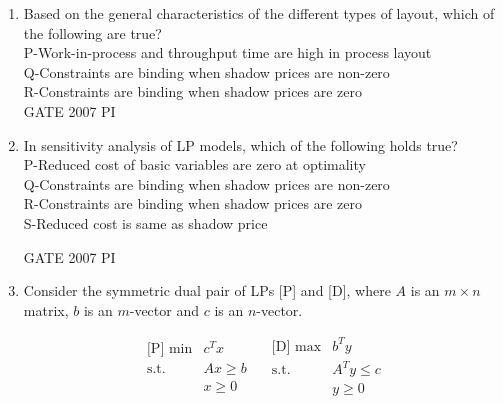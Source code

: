 \documentclass[journal,12pt,onecolumn]{IEEEtran}
\theoremstyle{remark}
\begin{document}
\begin{enumerate}
\item
Based on the general characteristics of the different types of layout, which of the following are true?\\
P-Work-in-process and throughput time are high in process layout\\

Q-Constraints are binding when shadow prices are non-zero \\

R-Constraints are binding when shadow prices are zero \\ 

\hfill{GATE 2007 PI}
\begin{enumerate}
\end{enumerate}

\item
In sensitivity analysis of LP models, which of the following holds true?\\
P-Reduced cost of basic variables are zero at optimality\\

  Q-Constraints are binding when shadow prices are non-zero\\
  
  R-Constraints are binding when shadow prices are zero\\
  
  S-Reduced cost is same as shadow price

  \hfill{GATE 2007 PI}
  \begin{enumerate}
  \end{enumerate}
  
  \item 
  Consider the symmetric dual pair of LPs [P] and [D], where $A$ is an $m \times n$ matrix, 
$b$ is an $m$-vector and $c$ is an $n$-vector.

\[
\begin{array}{c|c}
\text{[P] } \min & c^T x \\ 
\text{s.t.} & Ax \ge b \\
& x \ge 0
\end{array}
\quad
\begin{array}{c|c}
\text{[D] } \max & b^T y \\ 
\text{s.t.} & A^T y \le c \\
& y \ge 0
\end{array}
\]


\end{enumerate}
\end{document}
